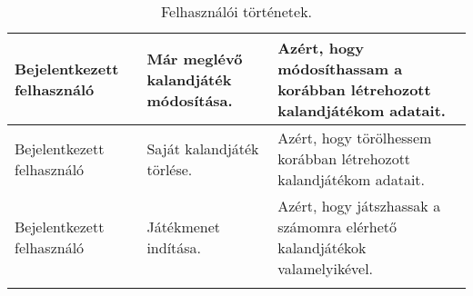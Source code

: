 \begin{center}
\begin{longtable}{ | m{} | 	m{} |m{}| }
		Bejelentkezett felhasználó & Már meglévő kalandjáték módosítása. & Azért, hogy módosíthassam a korábban létrehozott kalandjátékom adatait.\\
		\hline
		
		Bejelentkezett felhasználó & Saját kalandjáték törlése. & Azért, hogy törölhessem korábban létrehozott kalandjátékom adatait. \\
		\hline
		
		Bejelentkezett felhasználó & Játékmenet indítása. & Azért, hogy játszhassak a számomra elérhető kalandjátékok valamelyikével.\\
		\hline
		
	\caption{Felhasználói történetek.}
	\label{user_storys}
	\end{longtable}
\end{center}

